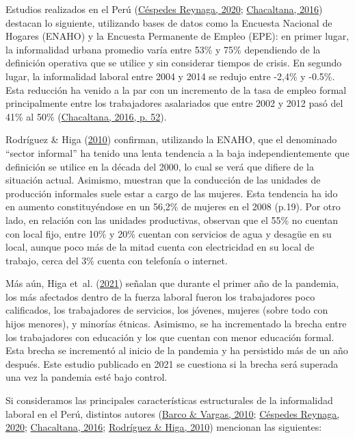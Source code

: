 \documentclass[
  letterpaper,
  12pt,
  oneside,
  spanish,
  doublespacing,
  headsepline,
  parskip]{MastersDoctoralThesis}
\begin{document}
Estudios realizados en el Perú
(\protect\hyperlink{ref-cuxe9spedesreynaga2020}{Céspedes Reynaga, 2020};
\protect\hyperlink{ref-chacaltana2016}{Chacaltana, 2016}) destacan lo
siguiente, utilizando bases de datos como la Encuesta Nacional de
Hogares (ENAHO) y la Encuesta Permanente de Empleo (EPE): en primer
lugar, la informalidad urbana promedio varía entre 53\% y 75\%
dependiendo de la definición operativa que se utilice y sin considerar
tiempos de crisis. En segundo lugar, la informalidad laboral entre 2004
y 2014 se redujo entre -2,4\% y -0.5\%. Esta reducción ha venido a la
par con un incremento de la tasa de empleo formal principalmente entre
los trabajadores asalariados que entre 2002 y 2012 pasó del 41\% al 50\%
(\protect\hyperlink{ref-chacaltana2016}{Chacaltana, 2016, p. 52}).

Rodríguez \& Higa (\protect\hyperlink{ref-rodruxedguez2010}{2010})
confirman, utilizando la ENAHO, que el denominado ``sector informal'' ha
tenido una lenta tendencia a la baja independientemente que definición
se utilice en la década del 2000, lo cual se verá que difiere de la
situación actual. Asimismo, muestran que la conducción de las unidades
de producción informales suele estar a cargo de las mujeres. Esta
tendencia ha ido en aumento constituyéndose en un 56,2\% de mujeres en
el 2008 (p.19). Por otro lado, en relación con las unidades productivas,
observan que el 55\% no cuentan con local fijo, entre 10\% y 20\%
cuentan con servicios de agua y desagüe en su local, aunque poco más de
la mitad cuenta con electricidad en su local de trabajo, cerca del 3\%
cuenta con telefonía o internet.

Más aún, Higa et~al. (\protect\hyperlink{ref-higa2021}{2021}) señalan
que durante el primer año de la pandemia, los más afectados dentro de la
fuerza laboral fueron los trabajadores poco calificados, los
trabajadores de servicios, los jóvenes, mujeres (sobre todo con hijos
menores), y minorías étnicas. Asimismo, se ha incrementado la brecha
entre los trabajadores con educación y los que cuentan con menor
educación formal. Esta brecha se incrementó al inicio de la pandemia y
ha persistido más de un año después. Este estudio publicado en 2021 se
cuestiona si la brecha será superada una vez la pandemia esté bajo
control.

Si consideramos las principales características estructurales de la
informalidad laboral en el Perú, distintos autores
(\protect\hyperlink{ref-barco2010}{Barco \& Vargas, 2010};
\protect\hyperlink{ref-cuxe9spedesreynaga2020}{Céspedes Reynaga, 2020};
\protect\hyperlink{ref-chacaltana2016}{Chacaltana, 2016};
\protect\hyperlink{ref-rodruxedguez2010}{Rodríguez \& Higa, 2010})
mencionan las siguientes:
\end{document}
